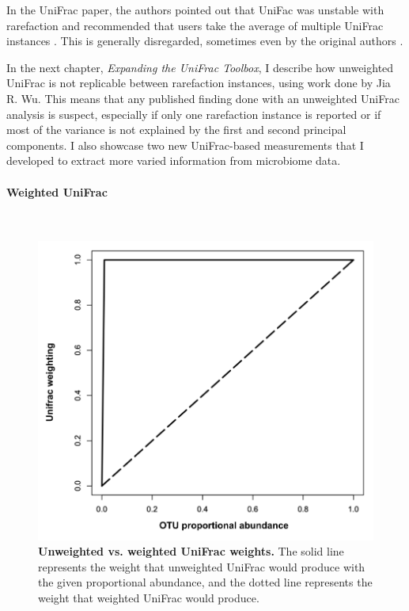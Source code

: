 In the UniFrac paper, the authors pointed out that UniFac was unstable with rarefaction and recommended that users take the average of multiple UniFrac instances \cite{lozupone2011unifrac}. This is generally disregarded, sometimes even by the original authors \cite{mckenna2008macaque} \cite{mcnulty2011impact}.

In the next chapter, \textit{Expanding the UniFrac Toolbox}, I describe how unweighted UniFrac is not replicable between rarefaction instances, using work done by Jia R. Wu. This means that any published finding done with an unweighted UniFrac analysis is suspect, especially if only one rarefaction instance is reported or if most of the variance is not explained by the first and second principal components. I also showcase two new UniFrac-based measurements that I developed to extract more varied information from microbiome data.

\FloatBarrier

\paragraph{Weighted UniFrac}\mbox{}\\

\begin{figure}[h]
\includegraphics[scale=0.5]{weights.png}
\caption[Unweighted vs. weighted UniFrac weights.]{{\bf Unweighted vs. weighted UniFrac weights.}
The solid line represents the weight that unweighted UniFrac would produce with the given proportional abundance, and the dotted line represents the weight that weighted UniFrac would produce.}
\label{figure_weights}
\end{figure}

